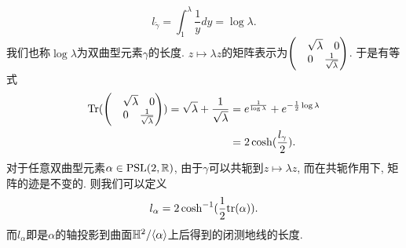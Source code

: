 \begin{equation}
    l_{\tilde{\gamma}}= \int^\lambda_1 \frac{1}{y}dy=\log \lambda.
\end{equation}
我们也称$\log\lambda$为双曲型元素$\gamma$的长度.  $z \mapsto \lambda z$的矩阵表示为$\begin{pmatrix}
    &\sqrt{\lambda} {\quad} 0 \\
    & 0 {\quad} {{\frac{1}{\sqrt{\lambda}}}}
\end{pmatrix}$. 于是有等式
\begin{equation}
    \begin{split}
        \text{Tr}(\begin{pmatrix}
                    &\sqrt{\lambda} {\quad} 0 \\
                    & 0 {\quad} {{\frac{1}{\sqrt{\lambda}}}}
        \end{pmatrix}) = \sqrt{\lambda}+{{\frac{1}{\sqrt{\lambda}}}} & = e^{{{\frac{1}{\log \lambda}}}} + e^{-{{\frac{1}{2}}}\log \lambda} \\ 
        & = 2\cosh(\frac{l_\gamma}{2}).
    \end{split}
\end{equation}
对于任意双曲型元素$\alpha \in {\text{PSL}}(2,{\mathbb{R}})$, 由于$\gamma$可以共轭到$z \mapsto \lambda z$, 而在共轭作用下, 矩阵的迹是不变的.  则我们可以定义
\begin{equation}
    l_\alpha= 2\cosh^{-1}({{\frac{1}{2}}}\text{tr}(\alpha)).
\end{equation}
而$l_\alpha$即是$\alpha$的轴投影到曲面${\mathbb{H}^2}/{\left< {\alpha} \right>}$上后得到的闭测地线的长度.
